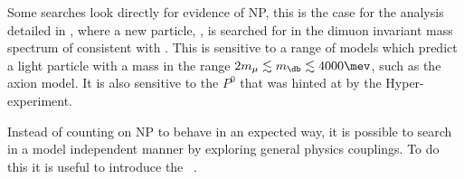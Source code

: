 





Some searches look directly for evidence of NP, this is the case for the analysis detailed in
, where a new particle, \db, is searched for in the dimuon invariant mass spectrum of
\decay{\Bd}{\Kstarent\mumu} consistent with \decay{\db}{\mumu}.
This is sensitive to a range of models which predict a light particle with a mass in the range
$2m_\mu\lesssim m_\db\lesssim4000\mev$, such as the axion model.
It is also sensitive to the $P^0$ that was hinted at by the Hyper-\CP experiment.

Instead of counting on NP to behave in an expected way, it is possible to search in a model
independent manner by exploring general physics couplings.
To do this it is useful to introduce the \OPE~\cite{PhysRev.179.1499}.


